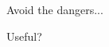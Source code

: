 \begin{tdocwarn}
    Avoid the dangers...
\end{tdocwarn}

\begin{tdocwarn}
    Useful?
\end{tdocwarn}
